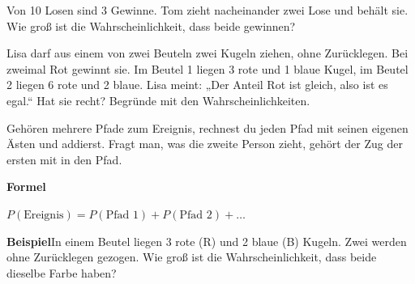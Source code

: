 \documentclass[11pt]{article}
\newcommand{\aufg}[3]{\par\noindent\makebox[0pt][r]{#3}\begin{minipage}[t]{\linewidth}#1\end{minipage}\par}
\newcommand{\nr}[1]{\makebox[7mm][l]{\textbf{#1}}}
\newlength{\kr}
\begin{document}
\medskip
\aufg{\nr{3.}Von 10 Losen sind 3 Gewinne. Tom zieht nacheinander zwei Lose und behält sie. Wie groß ist die Wahrscheinlichkeit, dass beide gewinnen?}{}{}
\medskip
\aufg{\nr{4.}Lisa darf aus einem von zwei Beuteln zwei Kugeln ziehen, ohne Zurücklegen. Bei zweimal Rot gewinnt sie. Im Beutel 1 liegen 3 rote und 1 blaue Kugel, im Beutel 2 liegen 6 rote und 2 blaue. Lisa meint: „Der Anteil Rot ist gleich, also ist es egal.“ Hat sie recht? Begründe mit den Wahrscheinlichkeiten.}{}{{\scriptsize\color{mbgrau}Ziel\hspace{2mm}}}
\medskip
\par\vspace{3mm}\setlength{\kr}{\dimexpr\pagegoal-\pagetotal-10mm\relax}%
\ifdim\kr>12mm\noindent{\scriptsize\color{mbgrau}Platz zum Rechnen}\par\nointerlineskip\vspace{1mm}\noindent
\begin{tikzpicture}\clip (0,0) rectangle ({\linewidth-0.5mm},\kr);\draw[black!16,line width=0.3pt,step=5mm] (0,0) grid (\linewidth,\kr);\end{tikzpicture}\fi\par
\clearpage\label{s:B}\noindent\colorbox{black!12}{}\hspace{3mm}{\Large\bfseries Mehrere Pfade, zweite Person}\par\smallskip
\noindent Gehören mehrere Pfade zum Ereignis, rechnest du jeden Pfad mit seinen eigenen Ästen und addierst. Fragt man, was die zweite Person zieht, gehört der Zug der ersten mit in den Pfad.\par\medskip
\noindent\textbf{Formel}\par\nopagebreak\noindent\hspace*{4mm}\begin{minipage}{\dimexpr\linewidth-4mm\relax}$P(\text{Ereignis}) = P(\text{Pfad 1}) + P(\text{Pfad 2}) + \ldots$\end{minipage}\par\medskip
\noindent\textbf{Beispiel}\quad In einem Beutel liegen 3 rote (R) und 2 blaue (B) Kugeln. Zwei werden ohne Zurücklegen gezogen. Wie groß ist die Wahrscheinlichkeit, dass beide dieselbe Farbe haben?\par\smallskip
\end{document}
